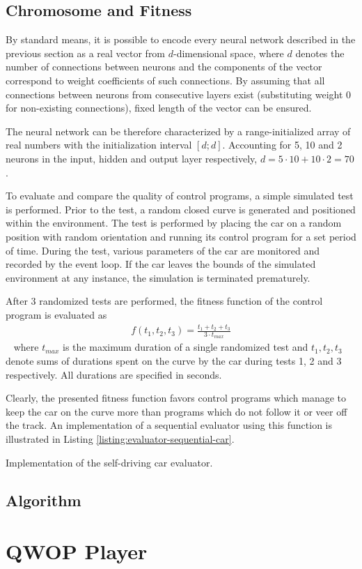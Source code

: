 \subsection{Chromosome and Fitness}
By standard means, it is possible to encode every neural network described in the previous section as a real vector from $d$-dimensional space, where $d$ denotes the number of connections between neurons and the components of the vector correspond to weight coefficients of such connections. By assuming that all connections between neurons from consecutive layers exist (substituting weight 0 for non-existing connections), fixed length of the vector can be ensured.

The neural network can be therefore characterized by a range-initialized array of real numbers with the initialization interval $[d;d]$. Accounting for 5, 10 and 2 neurons in the input, hidden and output layer respectively, $d=5\cdot 10+10\cdot 2=70$.

To evaluate and compare the quality of control programs, a simple simulated test is performed. Prior to the test, a random closed curve is generated and positioned within the environment. The test is performed by placing the car on a random position with random orientation and running its control program for a set period of time. During the test, various parameters of the car are monitored and recorded by the event loop. If the car leaves the bounds of the simulated environment at any instance, the simulation is terminated prematurely. 

After 3 randomized tests are performed, the fitness function of the control program is evaluated as
~
\begin{align}
	f(t_1,t_2,t_3) = \frac{t_1 + t_2 + t_3}{3 \cdot t_{max}}
\end{align}
~
where $t_{max}$ is the maximum duration of a single randomized test and $t_1,t_2,t_3$ denote sums of durations spent on the curve by the car during tests 1, 2 and 3 respectively. All durations are specified in seconds.

Clearly, the presented fitness function favors control programs which manage to keep the car on the curve more than programs which do not follow it or veer off the track. An implementation of a sequential evaluator using this function is illustrated in Listing \ref{listing:evaluator-sequential-car}.

\begin{listing}[ht]
	\caption{Implementation of the self-driving car evaluator.}
	\label{listing:evaluator-sequential-car}
\end{listing}

\subsection{Algorithm}
\todo

\section{QWOP Player}
\todo

